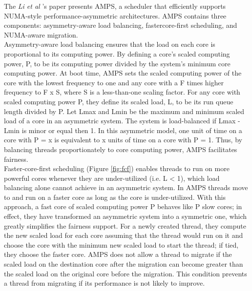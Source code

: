 \documentclass[a4paper,10pt]{article}
\begin{document}
\begin{multicols}{2}
The \emph{Li et al} 's paper \cite{Li07efficientoperating} presents AMPS, a scheduler that efficiently supports NUMA-style performance-asymmetric architectures. AMPS contains three components: asymmetry-aware load balancing, fastercore-first scheduling, and NUMA-aware migration.\\
Asymmetry-aware load balancing ensures that the load on each core is proportional to its computing power. By defining a core's scaled computing power, P, to be its computing power divided by the system's minimum core computing power. At boot time, AMPS sets the scaled computing power of the core with the lowest frequency to one and any core with a F times higher frequency to F x S, where S is a less-than-one scaling factor. For any core with scaled computing power P, they define its scaled load, L, to be its run queue length divided by P. Let Lmax and Lmin be the maximum and minimum scaled load of a core in an asymmetric system. The system is load-balanced if Lmax - Lmin is minor or equal then 1. In this asymmetric model, one unit of time on a core with P = x is equivalent to x units of time on a core with P = 1. Thus, by balancing threads proportionately to core computing power, AMPS facilitates fairness.\\
Faster-core-first scheduling (Figure \ref{fig:fcf}) enables threads to run on more powerful cores whenever they are under-utilized (i.e. L < 1), which load balancing alone cannot achieve in an asymmetric system. In AMPS threads move to and run on a faster core as long as the core is under-utilized. With this approach, a fast core of scaled computing power P behaves like P slow cores; in effect, they have transformed an asymmetric system into a symmetric one, which greatly simplifies the fairness support. For a newly created thread, they compute the new scaled load for each core assuming that the thread would run on it and choose the core with the minimum new scaled load to start the thread; if tied, they choose the faster core. AMPS does not allow a thread to migrate if the scaled load on the destination core after the migration can become greater than the  scaled load on the original core before the migration. This condition prevents a thread from migrating if its performance is not likely to improve.


\end{multicols}
\end{document}
